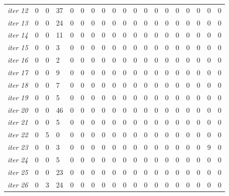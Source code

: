 \documentclass[12pt]{article}
\begin{document}
\begin{table}[ht]
{\begin{tabular}{lllllllllllllllllll}
									{\textit{iter 12}} &   0 &   0 &  37 &   0 &   0 &   0 &   0 &   0 &   0 &   0 &   0 &   0 &   0 &   0 &   0 &   0 &   0 &   0 \\ 
									{\textit{iter 13}} &   0 &   0 &  24 &   0 &   0 &   0 &   0 &   0 &   0 &   0 &   0 &   0 &   0 &   0 &   0 &   0 &   0 &   0 \\ 
									{\textit{iter 14}} &   0 &   0 &  11 &   0 &   0 &   0 &   0 &   0 &   0 &   0 &   0 &   0 &   0 &   0 &   0 &   0 &   0 &   0 \\ 
									{\textit{iter 15}} &   0 &   0 &   3 &   0 &   0 &   0 &   0 &   0 &   0 &   0 &   0 &   0 &   0 &   0 &   0 &   0 &   0 &   0 \\ 
									{\textit{iter 16}} &   0 &   0 &   2 &   0 &   0 &   0 &   0 &   0 &   0 &   0 &   0 &   0 &   0 &   0 &   0 &   0 &   0 &   0 \\ 
									{\textit{iter 17}} &   0 &   0 &   9 &   0 &   0 &   0 &   0 &   0 &   0 &   0 &   0 &   0 &   0 &   0 &   0 &   0 &   0 &   0 \\ 
									{\textit{iter 18}} &   0 &   0 &   7 &   0 &   0 &   0 &   0 &   0 &   0 &   0 &   0 &   0 &   0 &   0 &   0 &   0 &   0 &   0 \\ 
									{\textit{iter 19}} &   0 &   0 &   5 &   0 &   0 &   0 &   0 &   0 &   0 &   0 &   0 &   0 &   0 &   0 &   0 &   0 &   0 &   0 \\ 
									{\textit{iter 20}} &   0 &   0 &  46 &   0 &   0 &   0 &   0 &   0 &   0 &   0 &   0 &   0 &   0 &   0 &   0 &   0 &   0 &   0 \\ 
									{\textit{iter 21}} &   0 &   0 &   5 &   0 &   0 &   0 &   0 &   0 &   0 &   0 &   0 &   0 &   0 &   0 &   0 &   0 &   0 &   0 \\ 
									{\textit{iter 22}} &   0 &   5 &   0 &   0 &   0 &   0 &   0 &   0 &   0 &   0 &   0 &   0 &   0 &   0 &   0 &   0 &   0 &   0 \\ 
									{\textit{iter 23}} &   0 &   0 &   3 &   0 &   0 &   0 &   0 &   0 &   0 &   0 &   0 &   0 &   0 &   0 &   0 &   0 &   9 &   0 \\ 
									{\textit{iter 24}} &   0 &   0 &   5 &   0 &   0 &   0 &   0 &   0 &   0 &   0 &   0 &   0 &   0 &   0 &   0 &   0 &   0 &   0 \\ 
									{\textit{iter 25}} &   0 &   0 &  23 &   0 &   0 &   0 &   0 &   0 &   0 &   0 &   0 &   0 &   0 &   0 &   0 &   0 &   0 &   0 \\ 
									{\textit{iter 26}} &   0 &   3 &  24 &   0 &   0 &   0 &   0 &   0 &   0 &   0 &   0 &   0 &   0 &   0 &   0 &   0 &   0 &   0 \\ 

\end{tabular}}
\end{table}
\end{document}
